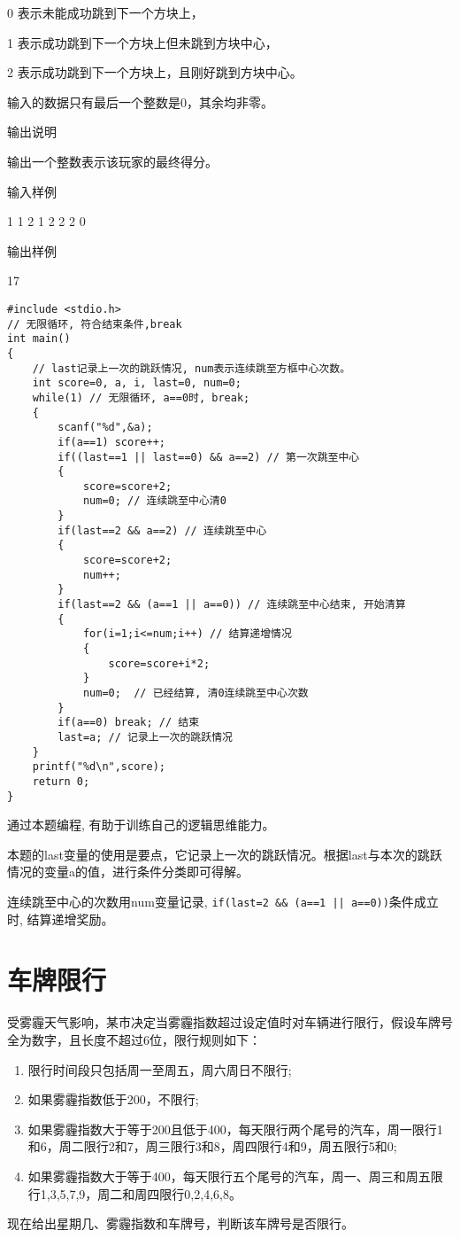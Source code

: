 0 表示未能成功跳到下一个方块上，

1 表示成功跳到下一个方块上但未跳到方块中心，

2 表示成功跳到下一个方块上，且刚好跳到方块中心。

输入的数据只有最后一个整数是0，其余均非零。

输出说明	

输出一个整数表示该玩家的最终得分。

输入样例	

1 1 2 1 2 2 2 0

输出样例
	
17

\begin{lstlisting}
#include <stdio.h>
// 无限循环, 符合结束条件,break
int main()
{
	// last记录上一次的跳跃情况, num表示连续跳至方框中心次数。
	int score=0, a, i, last=0, num=0; 
	while(1) // 无限循环, a==0时, break;
	{
		scanf("%d",&a);
		if(a==1) score++; 
		if((last==1 || last==0) && a==2) // 第一次跳至中心 
		{
			score=score+2; 
		    num=0; // 连续跳至中心清0
		} 
		if(last==2 && a==2) // 连续跳至中心
		{ 
			score=score+2; 
			num++;
		}  
		if(last==2 && (a==1 || a==0)) // 连续跳至中心结束, 开始清算
		{ 
			for(i=1;i<=num;i++) // 结算递增情况 
			{
				score=score+i*2;
			}
			num=0;  // 已经结算, 清0连续跳至中心次数
		} 
		if(a==0) break; // 结束
		last=a; // 记录上一次的跳跃情况
	}
	printf("%d\n",score);	
	return 0;
} 
\end{lstlisting}

\begin{note}[要点]
	通过本题编程, 有助于训练自己的逻辑思维能力。
	
	本题的last变量的使用是要点，它记录上一次的跳跃情况。根据last与本次的跳跃情况的变量a的值，进行条件分类即可得解。
	
	连续跳至中心的次数用num变量记录, \lstinline$if(last=2 && (a==1 || a==0))$条件成立时, 结算递增奖励。
\end{note}


\section{车牌限行}
受雾霾天气影响，某市决定当雾霾指数超过设定值时对车辆进行限行，假设车牌号全为数字，且长度不超过6位，限行规则如下： 
\begin{enumerate}
	\item 限行时间段只包括周一至周五，周六周日不限行;
	\item 如果雾霾指数低于200，不限行;
	\item 如果雾霾指数大于等于200且低于400，每天限行两个尾号的汽车，周一限行1和6，周二限行2和7，周三限行3和8，周四限行4和9，周五限行5和0;
	\item 如果雾霾指数大于等于400，每天限行五个尾号的汽车，周一、周三和周五限行1,3,5,7,9，周二和周四限行0,2,4,6,8。 	
\end{enumerate}
现在给出星期几、雾霾指数和车牌号，判断该车牌号是否限行。 


